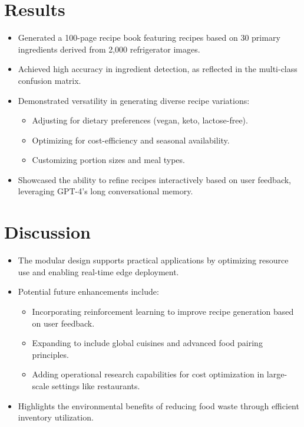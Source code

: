 \documentclass[letterpaper,11pt]{report}
\begin{document}
\section{Results}
\begin{itemize}
    \item Generated a 100-page recipe book featuring recipes based on 30 primary ingredients derived from 2,000 refrigerator images.
    \item Achieved high accuracy in ingredient detection, as reflected in the multi-class confusion matrix.
    \item Demonstrated versatility in generating diverse recipe variations:
          \begin{itemize}
              \item Adjusting for dietary preferences (vegan, keto, lactose-free).
              \item Optimizing for cost-efficiency and seasonal availability.
              \item Customizing portion sizes and meal types.
          \end{itemize}
    \item Showcased the ability to refine recipes interactively based on user feedback, leveraging GPT-4's long conversational memory.
\end{itemize}

\section{Discussion}
\begin{itemize}
    \item The modular design supports practical applications by optimizing resource use and enabling real-time edge deployment.
    \item Potential future enhancements include:
          \begin{itemize}
              \item Incorporating reinforcement learning to improve recipe generation based on user feedback.
              \item Expanding to include global cuisines and advanced food pairing principles.
              \item Adding operational research capabilities for cost optimization in large-scale settings like restaurants.
          \end{itemize}
    \item Highlights the environmental benefits of reducing food waste through efficient inventory utilization.
\end{itemize}
\end{document}
